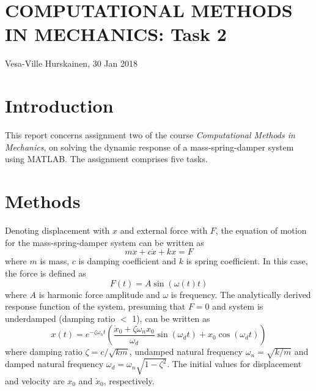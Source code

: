 \documentclass{article}
\begin{document}
	\section*{COMPUTATIONAL METHODS IN MECHANICS: Task 2}
	Vesa-Ville Hurskainen, 30 Jan 2018
	
	\section*{Introduction}
	This report concerns assignment two of the course \textit{Computational Methods in Mechanics}, on solving the dynamic response of a mass-spring-damper system using MATLAB. The assignment comprises five tasks.%
	
	
	\section*{Methods}
	Denoting displacement with $x$ and external force with $F$, the equation of motion for the mass-spring-damper system can be written as
	\begin{equation}
		m \ddot{x} + c \dot{x} + k x  = F
	\end{equation}
	where $m$ is mass, $c$ is damping coefficient and $k$ is spring coefficient. In this case, the force is defined as
	\begin{equation}
		F(t) = A \sin(\omega(t) t)
	\end{equation}
	where $A$ is harmonic force amplitude and $\omega$ is frequency. The analytically derived response function of the system, presuming that $F=0$ and system is underdamped (damping ratio $<$ 1), can be written as
	\begin{equation}
		x(t) = e^{-\zeta \omega_n t} \left(\frac{\dot{x}_0 + \zeta \omega_n x_0}{\omega_d} \sin(\omega_d t) + x_0 \cos(\omega_d t)\right)
	\end{equation}
	where damping ratio $\zeta = c / \sqrt{km}$, undamped natural frequency $\omega_n = \sqrt{k/m}$ and damped natural frequency $\omega_d = \omega_n \sqrt{1-\zeta^2}$. The initial values for displacement and velocity are $x_0$ and $\dot{x}_0$, respectively.\\
	
\end{document}
